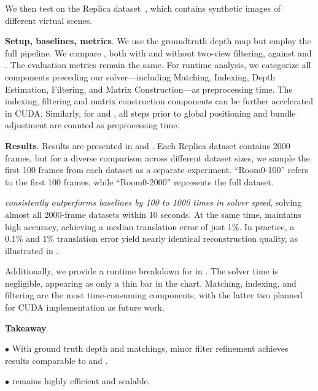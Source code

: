 

We then test on the Replica dataset~\cite{zhu2022nice, sucar2021imap, replica19arxiv}, which contains synthetic images of different virtual scenes. 

\textbf{Setup, baselines, metrics}.
We use the groundtruth depth map but employ the full \xmsfm pipeline. 
We compare \xmsfm, both with and without two-view filtering, against \colmap and \glomap. The evaluation metrics remain the same. For runtime analysis, we categorize all components preceding our \nameshort solver---including Matching, Indexing, Depth Estimation, Filtering, and Matrix Construction---as preprocessing time. The indexing, filtering and matrix construction components can be further accelerated in CUDA. Similarly, for \glomap and \colmap, all steps prior to global positioning and bundle adjustment are counted as preprocessing time.

\textbf{Results}.
Results are presented in  and . Each Replica dataset contains 2000 frames, but for a diverse comparison across different dataset sizes, we sample the first 100 frames from each dataset as a separate experiment. ``Room0-100'' refers to the first 100 frames, while ``Room0-2000'' represents the full dataset.  

\emph{\nameshort consistently outperforms baselines by 100 to 1000 times in solver speed}, solving almost all 2000-frame datasets within 10 seconds. At the same time, \nameshort maintains high accuracy, achieving a median translation error of just 1\%. In practice, a 0.1\% and 1\% translation error yield nearly identical reconstruction quality, as illustrated in .

Additionally, we provide a runtime breakdown for \nameshort in . The solver time is negligible, appearing as only a thin bar in the chart. Matching, indexing, and filtering are the most time-consuming components, with the latter two planned for CUDA implementation as future work.

\begin{tcolorbox}
    \begin{center}
        \vspace{-1mm}
        \textbf{Takeaway}
        \vspace{-1mm}
    \end{center} 
    $\bullet$ With ground truth depth and \colmap matchings, minor filter refinement achieves results comparable to \colmap and \glomap.  

    $\bullet$ \nameshort remains highly efficient and scalable.  
\end{tcolorbox}

